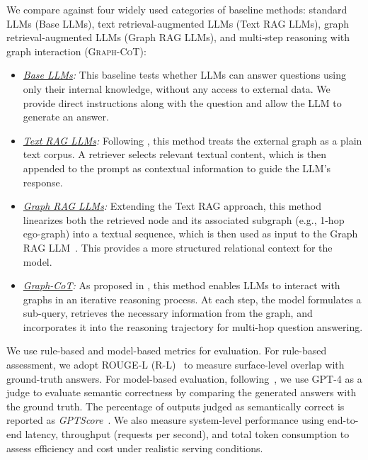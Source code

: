  We compare \projectname against four widely used categories of baseline methods: standard LLMs (Base LLMs), text retrieval-augmented LLMs (Text RAG LLMs), graph retrieval-augmented LLMs (Graph RAG LLMs), and multi-step reasoning with graph interaction (\textsc{Graph-CoT}):
\begin{itemize}[leftmargin=*, wide, itemindent=0pt, nosep]
    \item \textit{\underline{Base LLMs}:} This baseline tests whether LLMs\cite{qwen} can answer questions using only their internal knowledge, without any access to external data. We provide direct instructions along with the question and allow the LLM to generate an answer.

    \item \textit{\underline{Text RAG LLMs}:} Following \cite{gao2023retrieval}, this method treats the external graph as a plain text corpus. A retriever selects relevant textual content, which is then appended to the prompt as contextual information to guide the LLM's response.

    \item \textit{\underline{Graph RAG LLMs}:} Extending the Text RAG approach, this method linearizes both the retrieved node and its associated subgraph (e.g., 1-hop ego-graph) into a textual sequence, which is then used as input to the Graph RAG LLM~\cite{ye2023language}. This provides a more structured relational context for the model.

    \item \textit{\underline{Graph-CoT}:} As proposed in \cite{jin2024graph}, this method enables LLMs to interact with graphs in an iterative reasoning process. At each step, the model formulates a sub-query, retrieves the necessary information from the graph, and incorporates it into the reasoning trajectory for multi-hop question answering.
\end{itemize}

 We use rule-based and model-based metrics for evaluation. For rule-based assessment, we adopt ROUGE-L (R-L)~\cite{lin2004rouge} to measure surface-level overlap with ground-truth answers. For model-based evaluation, following~\cite{jin2024graph}, we use GPT-4 as a judge to evaluate semantic correctness by comparing the generated answers with the ground truth. The percentage of outputs judged as semantically correct is reported as \textit{GPTScore}~\cite{fu2023gptscore}. We also measure system-level performance using end-to-end latency, throughput (requests per second), and total token consumption to assess efficiency and cost under realistic serving conditions.

